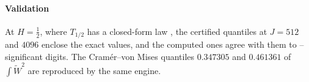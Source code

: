 \paragraph{Validation} At $H=\frac12$, where $T_{1/2}$ has a closed-form law \citep{AP97}, the certified quantiles at
$J=512$ and $4096$ enclose the exact values, and the computed ones agree with them to
-- significant digits. The Cram\'er--von Mises quantiles $0.347305$ and
$0.461361$ of $\int\tilde W^2$ \citep{KPSS92} are reproduced by the same engine.

\FloatBarrier
